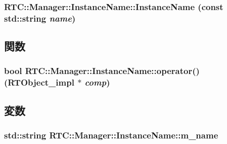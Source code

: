 \subsubsection[{InstanceName}]{\setlength{\rightskip}{0pt plus 5cm}RTC::Manager::InstanceName::InstanceName (const std::string {\em name})}\label{structRTC_1_1Manager_1_1InstanceName_aeaccb5c948903147fec54a30244aeeab}


\subsection{関数}
\subsubsection[{operator()}]{\setlength{\rightskip}{0pt plus 5cm}bool RTC::Manager::InstanceName::operator() ({\bf RTObject\_\-impl} $\ast$ {\em comp})}\label{structRTC_1_1Manager_1_1InstanceName_aea1ede840c201f3e9afd68385e4b9a9d}


\subsection{変数}
\subsubsection[{m\_\-name}]{\setlength{\rightskip}{0pt plus 5cm}std::string {\bf RTC::Manager::InstanceName::m\_\-name}}\label{structRTC_1_1Manager_1_1InstanceName_aa3744c310d19e37f9a793b0837f744b2}
